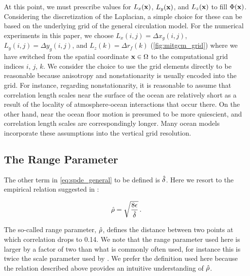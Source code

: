 At this point, we must prescribe values for $L_x(\mathbf{x})$, $L_y(\mathbf{x})$, and $L_z(\mathbf{x})$ to fill
$\Phi(\mathbf{x})$.
Considering the discretization of the Laplacian, a simple choice for these can
be based on the underlying grid of the general circulation model.
For the numerical experiments in this paper, we choose
$L_x(i,j) = \Delta x_g(i,j)$, $L_y(i,j) = \Delta y_g(i,j)$,
and $L_z(k) = \Delta r_f(k)$ (\cref{fig:mitgcm_grid}) where we have switched
from the spatial coordinate $\mathbf{x}\in\Omega$ to the computational grid indices $i$, $j$, $k$.
We consider the choice to use the grid elements directly to be reasonable
because anisotropy and nonstationarity is usually encoded into the grid.
For instance, regarding nonstationarity, it is reasonable to assume that
correlation length scales near the surface of the ocean are relatively short as
a result of the locality of atmosphere-ocean interactions that occur there.
On the other hand, near the ocean floor motion is presumed to be more
quiescient, and correlation length scales are correspondingly longer.
Many ocean models
\citep[e.g.][]{nguyen_arctic_2021, forgetECCOv4}
incorporate these assumptions into the vertical grid resolution.


\subsection{The Range Parameter}
\label{ssec:range_parameter}

The other term in \cref{eq:spde_general} to be defined is $\hat{\delta}$.
Here we resort to the empirical relation suggested in
\citet{RSSB:RSSB777}:
\begin{linenomath*}\begin{equation*}
    \hat{\rho} = \sqrt{\dfrac{8\epsilon}{\hat{\delta}}} \, .
\end{equation*}\end{linenomath*}
The so-called range parameter, $\hat{\rho}$, defines the
distance between two points at which correlation drops to 0.14.
We note that the range parameter used here is larger by a factor of two than
what is commonly often used, for instance this is twice the scale parameter used
by \citet{mirouze_representation_2010}.
We prefer the definition used here because the relation described above provides an intuitive
understanding of $\hat{\rho}$.

